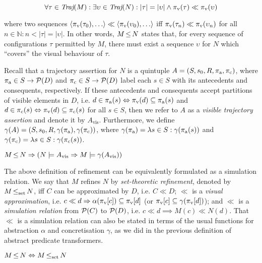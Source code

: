 \begin{equation*}
\forall \tau \in \operatorname{\textit{Traj}}(M) : \exists \upsilon \in \operatorname{\textit{Traj}}(N) : | \tau | = | \upsilon | \wedge \pi_{\textrm{v}}(\tau) \ll \pi_{\textrm{v}}(\upsilon)
\end{equation*}

\noindent where two sequences $\langle \pi_{\textrm{v}}(\tau_{0}), \ldots \rangle \ll \langle \pi_{\textrm{v}}(\upsilon_{0}), \ldots \rangle$ iff $\pi_{\textrm{v}}(\tau_{n}) \ll \pi_{\textrm{v}}(\upsilon_{n})$ for all $n \in \mathbb{N} : n < | \tau | = | \upsilon |$. In other words, $M \operatorname{\leq} N$ states that, for every sequence of configurations $\tau$ permitted by $M$, there must exist a sequence $\upsilon$ for $N$ which ``covers'' the visual behaviour of $\tau$.

Recall that a trajectory assertion for $N$ is a quintuple $A = (S, s_{0}, R, \operatorname{\pi_{\textrm{a}}}, \operatorname{\pi_{\textrm{c}}})$, where $\operatorname{\pi_{\textrm{a}}} \in S \rightarrow \mathcal{P}(D)$ and $\operatorname{\pi_{\textrm{c}}} \in S \rightarrow \mathcal{P}(D)$ label each $s \in S$ with its antecedents and consequents, respectively. If these antecedents and consequents accept partitions of visible elements in $D$, i.e. $d \in \operatorname{\pi_{\textrm{a}}}(s) \Leftrightarrow \pi_{\textrm{v}}(d) \subseteq \operatorname{\pi_{\textrm{a}}}(s)$ and $d \in \operatorname{\pi_{\textrm{c}}}(s) \Leftrightarrow \pi_{\textrm{v}}(d) \subseteq \operatorname{\pi_{\textrm{c}}}(s)$ for all $s \in S$, then we refer to $A$ as a \textit{visible trajectory assertion} and denote it by $A_{\textrm{vis}}$. Furthermore, we define $\gamma(A) = (S, s_{0}, R, \gamma(\operatorname{\pi_{\textrm{a}}}), \gamma(\operatorname{\pi_{\textrm{c}}}))$, where $\gamma(\operatorname{\pi_{\textrm{a}}}) = \lambda s \in S : \gamma(\operatorname{\pi_{\textrm{a}}}(s))$ and $\gamma(\operatorname{\pi_{\textrm{c}}}) = \lambda s \in S : \gamma(\operatorname{\pi_{\textrm{c}}}(s))$.




\begin{theorem} \label{thm:traj-refines}
$M \operatorname{\leq} N \Rightarrow (N \models A_{\textrm{vis}} \Rightarrow M \models \gamma(A_{\textrm{vis}}))$
\end{theorem}

The above definition of refinement can be equivalently formulated as a simulation relation. We say that $M$ refines $N$ by \textit{set-theoretic refinement}, denoted by $M \operatorname{\operatorname{\leq}_{\textrm{set}}} N$, iff $C$ can be approximated by $D$, i.e. $C \ll D$; $\ll$ is a \textit{visual approximation}, i.e. $c \ll d \Rightarrow \alpha(\pi_{\textrm{v}}[c]) \subseteq \pi_{\textrm{v}}[d]$ (or $\pi_{\textrm{v}}[c] \subseteq \gamma(\pi_{\textrm{v}}[d])$); and $\ll$ is a \textit{simulation relation} from $\mathcal{P}(C)$ to $\mathcal{P}(D)$, i.e. $c \ll d \implies M(c) \ll N(d)$. That $\ll$ is a simulation relation can also be stated in terms of the usual functions for abstraction $\alpha$ and concretisation $\gamma$, as we did in the previous definition of abstract predicate transformers.

\begin{theorem} \label{thm:traj-equal-set}
$M \operatorname{\leq} N \Leftrightarrow M \operatorname{\operatorname{\leq}_{\textrm{set}}} N$
\end{theorem}
